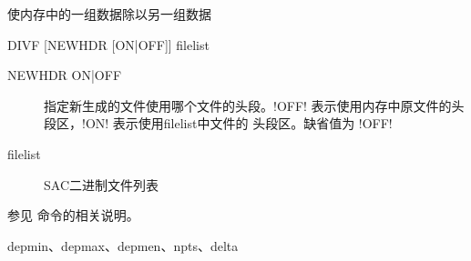 \label{cmd:divf}

使内存中的一组数据除以另一组数据

\begin{SACSTX}
DIVF [NEWHDR [ON|OFF]] filelist
\end{SACSTX}

\begin{description}
\item [NEWHDR ON|OFF] 指定新生成的文件使用哪个文件的头段。!OFF!
    表示使用内存中原文件的头段区，!ON! 表示使用filelist中文件的
    头段区。缺省值为 !OFF!
\item [filelist] SAC二进制文件列表
\end{description}

参见  命令的相关说明。

depmin、depmax、depmen、npts、delta

